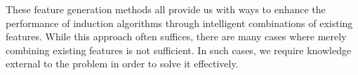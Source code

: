 \documentclass{article}
\theoremstyle{definition}
\begin{document}
These feature generation methods all provide us with ways to enhance the performance of induction algorithms through intelligent combinations of existing features. While this approach often suffices, there are many cases where merely combining existing features is not sufficient. 
In such cases, we require knowledge external to the problem in order to solve it effectively.

\end{document}
